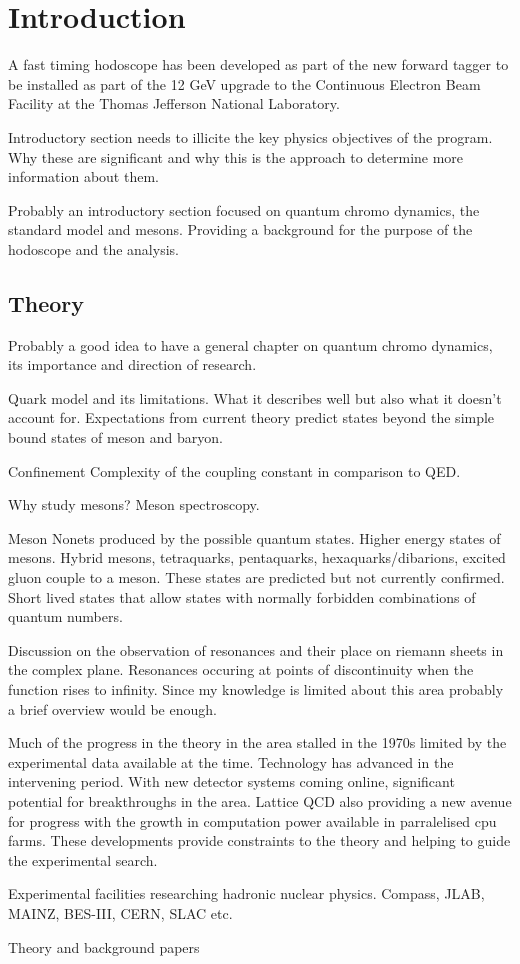 \chapter{Introduction}
A fast timing hodoscope has been developed as part of the new forward tagger to be installed as part of the 12 GeV upgrade to the Continuous Electron Beam Facility at the Thomas Jefferson National Laboratory.

Introductory section needs to illicite the key physics objectives of the program. Why these are significant and why this is the approach to determine more information about them.

Probably an introductory section focused on quantum chromo dynamics, the standard model and mesons. Providing a background for the purpose of the hodoscope and the analysis.
\section{Theory}
Probably a good idea to have a general chapter on quantum chromo dynamics, its importance and direction of research.

Quark model and its limitations. What it describes well but also what it doesn't account for. Expectations from current theory predict states beyond the simple bound states of meson and baryon.

Confinement
Complexity of the coupling constant in comparison to QED.

Why study mesons? Meson spectroscopy.

Meson Nonets produced by the possible quantum states.
Higher energy states of mesons.
Hybrid mesons, tetraquarks, pentaquarks, hexaquarks/dibarions, excited gluon couple to a meson. These states are predicted but not currently confirmed. Short lived states that allow states with normally forbidden combinations of quantum numbers.

Discussion on the observation of resonances and their place on riemann sheets in the complex plane. Resonances occuring at points of discontinuity when the function rises to infinity. Since my knowledge is limited about this area probably a brief overview would be enough.

Much of the progress in the theory in the area stalled in the 1970s limited by the experimental data available at the time. Technology has advanced in the intervening period. With new detector systems coming online, significant potential for breakthroughs in the area. Lattice QCD also providing a new avenue for progress with the growth in computation power available in parralelised cpu farms. These developments provide constraints to the theory and helping to guide the experimental search. 


Experimental facilities researching hadronic nuclear physics. Compass, JLAB, MAINZ, BES-III, CERN, SLAC etc. 

Theory and background papers
\cite{dudek2011lattice}
\cite{jaffe1977multiquark}
\cite{bali1993comprehensive}
\cite{johnson1975bag}
\cite{dombey1969scattering}
\cite{schilling1973analyse}